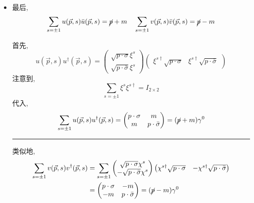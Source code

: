 \begin{itemize}
	\item 最后,
	\begin{equation}
		\sum_{s = \pm 1} u(\vec{p}, s) \bar{u}(\vec{p}, s) = \cancel{p} + m \quad \sum_{s = \pm 1} v(\vec{p}, s) \bar{v}(\vec{p}, s) = \cancel{p} - m
	\end{equation}
	
	\begin{tcolorbox}[title=calculation:]
		首先,
		\begin{equation}
			u(\vec{p}, s) u^\dag(\vec{p}, s) = \begin{pmatrix}
				\sqrt{p \cdot \sigma} \xi^s \\
				\sqrt{p \cdot \bar{\sigma}} \xi^s
			\end{pmatrix} \begin{pmatrix}
				\xi^{s \dag} \sqrt{p \cdot \sigma} & \xi^{s \dag} \sqrt{p \cdot \bar{\sigma}}
			\end{pmatrix}
		\end{equation}
		注意到,
		\begin{equation}
			\sum_{s = \pm 1} \xi^{s} \xi^{s \dag} = I_{2 \times 2}
		\end{equation}
		代入,
		\begin{equation}
			\sum_{s = \pm 1} u(\vec{p}, s) u^\dag(\vec{p}, s) = \begin{pmatrix}
				p \cdot \sigma & m \\
				m & p \cdot \bar{\sigma}
			\end{pmatrix} = (\cancel{p} + m) \gamma^0
		\end{equation}
		
		\noindent\rule[0.5ex]{\linewidth}{0.5pt} %
		
		类似地,
		\begin{align}
			\sum_{s = \pm 1} v(\vec{p}, s) v^\dag(\vec{p}, s) &= \sum_{s = \pm 1} \begin{pmatrix}
				\sqrt{p \cdot \sigma} \chi^s \\
				- \sqrt{p \cdot \bar{\sigma}} \chi^s
			\end{pmatrix} \begin{pmatrix}
				\chi^{s \dag} \sqrt{p \cdot \sigma} & - \chi^{s \dag} \sqrt{p \cdot \bar{\sigma}}
			\end{pmatrix} \notag \\
			&= \begin{pmatrix}
				p \cdot \sigma & - m \\
				- m & p \cdot \bar{\sigma}
			\end{pmatrix} = (\cancel{p} - m) \gamma^0
		\end{align}
	\end{tcolorbox}
\end{itemize}


